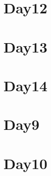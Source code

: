 
\section*{Day12}

\vfill
\section*{Day13}

\vfill
\section*{Day14}

\vfill
\section*{Day9}

\vfill
\section*{Day10}

\vfill
